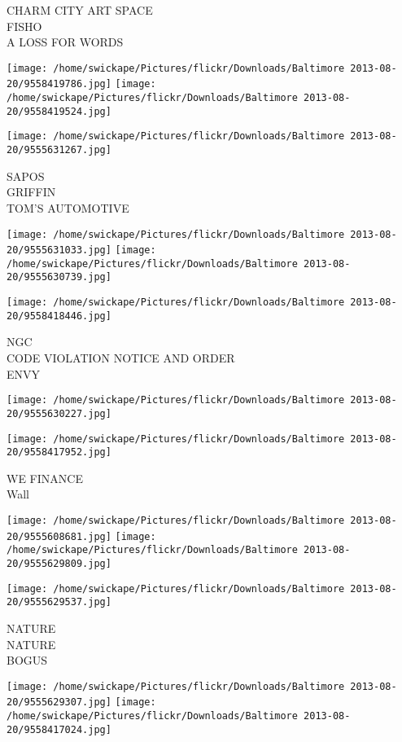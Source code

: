\documentclass[10pt,letterpaper]{article}
\begin{document}
CHARM CITY ART SPACE\\
FISHO\\
A LOSS FOR WORDS
\pagebreak

\texttt{[image: /home/swickape/Pictures/flickr/Downloads/Baltimore 2013-08-20/9558419786.jpg]}
\texttt{[image: /home/swickape/Pictures/flickr/Downloads/Baltimore 2013-08-20/9558419524.jpg]}

\vspace{0.25in}
\texttt{[image: /home/swickape/Pictures/flickr/Downloads/Baltimore 2013-08-20/9555631267.jpg]}

SAPOS\\
GRIFFIN\\
TOM'S AUTOMOTIVE
\pagebreak

\texttt{[image: /home/swickape/Pictures/flickr/Downloads/Baltimore 2013-08-20/9555631033.jpg]}
\texttt{[image: /home/swickape/Pictures/flickr/Downloads/Baltimore 2013-08-20/9555630739.jpg]}

\vspace{0.25in}
\texttt{[image: /home/swickape/Pictures/flickr/Downloads/Baltimore 2013-08-20/9558418446.jpg]}

NGC\\
CODE VIOLATION NOTICE AND ORDER\\
ENVY
\pagebreak

\texttt{[image: /home/swickape/Pictures/flickr/Downloads/Baltimore 2013-08-20/9555630227.jpg]}

\vspace{0.25in}
\texttt{[image: /home/swickape/Pictures/flickr/Downloads/Baltimore 2013-08-20/9558417952.jpg]}

WE FINANCE\\
Wall
\pagebreak

\texttt{[image: /home/swickape/Pictures/flickr/Downloads/Baltimore 2013-08-20/9555608681.jpg]}
\texttt{[image: /home/swickape/Pictures/flickr/Downloads/Baltimore 2013-08-20/9555629809.jpg]}

\vspace{0.25in}
\texttt{[image: /home/swickape/Pictures/flickr/Downloads/Baltimore 2013-08-20/9555629537.jpg]}

NATURE\\
NATURE\\
BOGUS
\pagebreak

\texttt{[image: /home/swickape/Pictures/flickr/Downloads/Baltimore 2013-08-20/9555629307.jpg]}
\texttt{[image: /home/swickape/Pictures/flickr/Downloads/Baltimore 2013-08-20/9558417024.jpg]}
\end{document}

